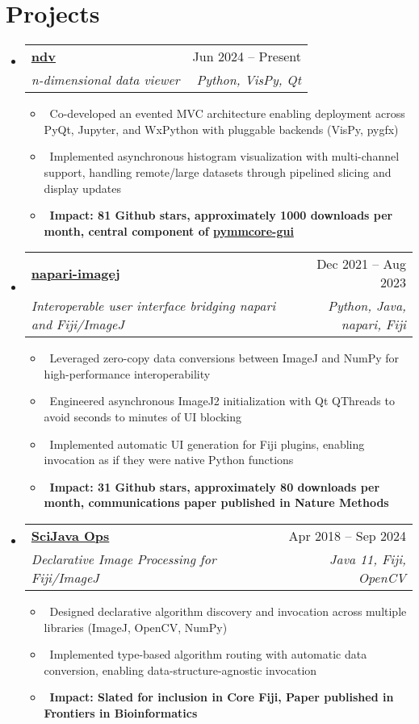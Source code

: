 \documentclass[letterpaper,10pt]{article}
\makeatletter
\newcommand{\resumeItem}[1]{\item\small{#1}}
\newcommand{\resumeSubheading}[4]{
\vspace{-1pt}\item
  \begin{tabular*}{0.97\textwidth}[t]{l@{\extracolsep{\fill}}r}
    \textbf{#1} & #2 \\
    \textit{#3} & \textit{#4} \\
  \end{tabular*}\vspace{-7pt}
}
\newcommand{\resumeSubHeadingList}{\begin{itemize}[leftmargin=0.15in, label={}]}
\newcommand{\resumeSubHeadingListEnd}{\end{itemize}}
\makeatother
\begin{document}
\section{Projects}
\resumeSubHeadingList
  \resumeSubheading
      {\href{https://pyapp-kit.github.io/ndv/latest/}{ndv}}{Jun 2024 -- Present}
      {n-dimensional data viewer}{Python, VisPy, Qt}
      \resumeSubHeadingList
          \resumeItem{\textbullet\ Co-developed an evented MVC architecture enabling deployment across PyQt, Jupyter, and WxPython with pluggable backends (VisPy, pygfx)}
          \resumeItem{\textbullet\ Implemented asynchronous histogram visualization with multi-channel support, handling remote/large datasets through pipelined slicing and display updates}
          \resumeItem{\textbullet\ \textbf{Impact: 81 Github stars, approximately 1000 downloads per month, central component of \href{https://github.com/pymmcore-plus/pymmcore-gui}{pymmcore-gui}}}
      \resumeSubHeadingListEnd
  \resumeSubheading
      {\href{https://napari.imagej.net/en/stable/}{napari-imagej}}{Dec 2021 -- Aug 2023}
      {Interoperable user interface bridging napari and Fiji/ImageJ}{Python, Java, napari, Fiji}
      \resumeSubHeadingList
        \resumeItem{\textbullet\ Leveraged zero-copy data conversions between ImageJ and NumPy for high-performance interoperability}
        \resumeItem{\textbullet\ Engineered asynchronous ImageJ2 initialization with Qt QThreads to avoid seconds to minutes of UI blocking}
        \resumeItem{\textbullet\ Implemented automatic UI generation for Fiji plugins, enabling invocation as if they were native Python functions}
        \resumeItem{\textbullet\ \textbf{Impact: 31 Github stars, approximately 80 downloads per month, communications paper published in Nature Methods}}
      \resumeSubHeadingListEnd
\resumeSubheading
      {\href{https://ops.scijava.org/en/latest/}{SciJava Ops}}{Apr 2018 -- Sep 2024}
      {Declarative Image Processing for Fiji/ImageJ}{Java 11, Fiji, OpenCV}
      \resumeSubHeadingList
        \resumeItem{\textbullet\ Designed declarative algorithm discovery and invocation across multiple libraries (ImageJ, OpenCV, NumPy)}
        \resumeItem{\textbullet\ Implemented type-based algorithm routing with automatic data conversion, enabling data-structure-agnostic invocation}
        \resumeItem{\textbullet\ \textbf{Impact: Slated for inclusion in Core Fiji, Paper published in Frontiers in Bioinformatics}}
      \resumeSubHeadingListEnd
\resumeSubHeadingListEnd
\end{document}
